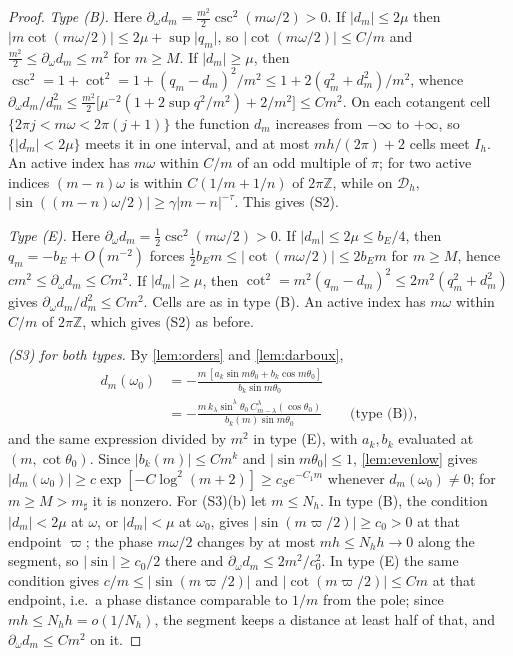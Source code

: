 \documentclass[11pt]{amsart}
\numberwithin{equation}{section}
\theoremstyle{definition}
\theoremstyle{remark}
\newcommand{\Z}{\mathbb{Z}}
\newcommand{\abs}[1]{\lvert #1\rvert}
\newcommand{\Dh}{\mathcal D_h}
\begin{document}
\begin{proof}
\emph{Type (B).} Here $\partial_\omega d_m=\frac{m^2}2\csc^2(m\omega/2)>0$. If $\abs{d_m}\le2\mu$ then $\abs{m\cot(m\omega/2)}\le2\mu+\sup\abs{q_m}$, so $\abs{\cot(m\omega/2)}\le C/m$ and $\frac{m^2}2\le\partial_\omega d_m\le m^2$ for $m\ge M$. If $\abs{d_m}\ge\mu$, then $\csc^2=1+\cot^2=1+(q_m-d_m)^2/m^2\le1+2(q_m^2+d_m^2)/m^2$, whence $\partial_\omega d_m/d_m^2\le\frac{m^2}2\bigl[\mu^{-2}(1+2\sup q^2/m^2)+2/m^2\bigr]\le Cm^2$. On each cotangent cell $\{2\pi j<m\omega<2\pi(j+1)\}$ the function $d_m$ increases from $-\infty$ to $+\infty$, so $\{\abs{d_m}<2\mu\}$ meets it in one interval, and at most $mh/(2\pi)+2$ cells meet $I_h$. An active index has $m\omega$ within $C/m$ of an odd multiple of $\pi$; for two active indices $(m-n)\omega$ is within $C(1/m+1/n)$ of $2\pi\Z$, while on $\Dh$, $\abs{\sin((m-n)\omega/2)}\ge\gamma\abs{m-n}^{-\tau}$. This gives (S2).

\emph{Type (E).} Here $\partial_\omega d_m=\frac12\csc^2(m\omega/2)>0$. If $\abs{d_m}\le2\mu\le b_E/4$, then $q_m=-b_E+O(m^{-2})$ forces $\frac12b_Em\le\abs{\cot(m\omega/2)}\le2b_Em$ for $m\ge M$, hence $cm^2\le\partial_\omega d_m\le Cm^2$. If $\abs{d_m}\ge\mu$, then $\cot^2=m^2(q_m-d_m)^2\le2m^2(q_m^2+d_m^2)$ gives $\partial_\omega d_m/d_m^2\le Cm^2$. Cells are as in type (B). An active index has $m\omega$ within $C/m$ of $2\pi\Z$, which gives (S2) as before.

\emph{(S3) for both types.} By \cref{lem:orders} and \cref{lem:darboux},
\begin{align*}
d_m(\omega_0)&=-\frac{m\,[a_k\sin m\theta_0+b_k\cos m\theta_0]}{b_k\sin m\theta_0}\\
&=-\frac{m\,k_\lambda\sin^\lambda\theta_0\,C^\lambda_{m-\lambda}(\cos\theta_0)}{b_k(m)\sin m\theta_0}\qquad\text{(type (B))},
\end{align*}
and the same expression divided by $m^2$ in type (E), with $a_k,b_k$ evaluated at $(m,\cot\theta_0)$. Since $\abs{b_k(m)}\le Cm^{k}$ and $\abs{\sin m\theta_0}\le1$, \cref{lem:evenlow} gives $\abs{d_m(\omega_0)}\ge c\exp[-C\log^2(m+2)]\ge c_Se^{-C_1m}$ whenever $d_m(\omega_0)\ne0$; for $m\ge M>m_\sharp$ it is nonzero. For (S3)(b) let $m\le N_h$. In type (B), the condition $\abs{d_m}<2\mu$ at $\omega$, or $\abs{d_m}<\mu$ at $\omega_0$, gives $\abs{\sin(m\varpi/2)}\ge c_0>0$ at that endpoint $\varpi$; the phase $m\omega/2$ changes by at most $mh\le N_hh\to0$ along the segment, so $\abs{\sin}\ge c_0/2$ there and $\partial_\omega d_m\le2m^2/c_0^2$. In type (E) the same condition gives $c/m\le\abs{\sin(m\varpi/2)}$ and $\abs{\cot(m\varpi/2)}\le Cm$ at that endpoint, i.e.\ a phase distance comparable to $1/m$ from the pole; since $mh\le N_hh=o(1/N_h)$, the segment keeps a distance at least half of that, and $\partial_\omega d_m\le Cm^2$ on it.
\end{proof}
\end{document}
